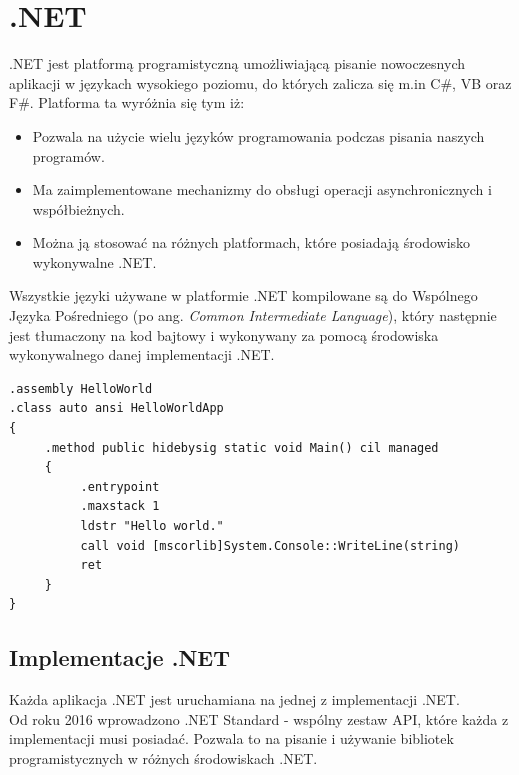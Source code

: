 


{\let\cleardoublepage\relax \chapter{.NET}}
\label{cha:wstep}

.NET jest platformą programistyczną umożliwiającą pisanie nowoczesnych aplikacji w językach wysokiego poziomu, do których zalicza się m.in C\#, VB oraz F\#. Platforma ta wyróżnia się tym iż:
\begin{itemize}
	\item Pozwala na użycie wielu języków programowania podczas pisania naszych programów.
	\item Ma zaimplementowane mechanizmy do obsługi operacji asynchronicznych i współbieżnych.
	\item Można ją stosować na różnych platformach, które posiadają środowisko wykonywalne .NET.
\end{itemize}
Wszystkie języki używane w platformie .NET kompilowane są do Wspólnego Języka Pośredniego (po ang. \textit{Common Intermediate Language}), który następnie jest tłumaczony na kod bajtowy i wykonywany za pomocą środowiska wykonywalnego danej implementacji .NET.

\begin{lstlisting}[frame=single, numbers=none,captionpos=b, 
caption={Przykładowy kod aplikacji "Hello World" w języku CIL}]
.assembly HelloWorld
.class auto ansi HelloWorldApp
{
     .method public hidebysig static void Main() cil managed
     {
          .entrypoint
          .maxstack 1
          ldstr "Hello world."
          call void [mscorlib]System.Console::WriteLine(string)
          ret
     }
}
\end{lstlisting}


\section{Implementacje .NET}

Każda aplikacja .NET jest uruchamiana na jednej z implementacji .NET. \\
Od roku 2016 wprowadzono .NET Standard - wspólny zestaw API, które każda z implementacji musi posiadać. Pozwala to na pisanie i używanie bibliotek programistycznych w różnych środowiskach .NET.

